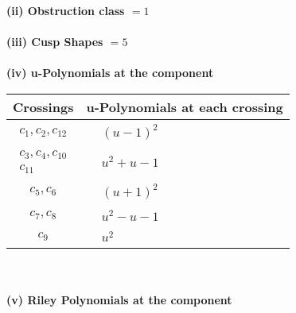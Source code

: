 \documentclass[1p]{elsarticle_modified}
\theoremstyle{definition}
\begin{document}
\flushleft \textbf{(ii) Obstruction class $= 1$}\\~\\
\flushleft \textbf{(iii) Cusp Shapes $= 5$}\\~\\
\newpage\renewcommand{\arraystretch}{1}
\flushleft \textbf{(iv) u-Polynomials at the component}\newline \\
\begin{tabular}{m{50pt}|m{274pt}}
Crossings & \hspace{64pt}u-Polynomials at each crossing \\
\hline $$\begin{aligned}c_{1},c_{2},c_{12}\end{aligned}$$&$\begin{aligned}
&(u-1)^2
\end{aligned}$\\
\hline $$\begin{aligned}c_{3},c_{4},c_{10}\\c_{11}\end{aligned}$$&$\begin{aligned}
&u^2+u-1
\end{aligned}$\\
\hline $$\begin{aligned}c_{5},c_{6}\end{aligned}$$&$\begin{aligned}
&(u+1)^2
\end{aligned}$\\
\hline $$\begin{aligned}c_{7},c_{8}\end{aligned}$$&$\begin{aligned}
&u^2- u-1
\end{aligned}$\\
\hline $$\begin{aligned}c_{9}\end{aligned}$$&$\begin{aligned}
&u^2
\end{aligned}$\\
\hline
\end{tabular}\\~\\
\newpage\renewcommand{\arraystretch}{1}
\flushleft \textbf{(v) Riley Polynomials at the component}\newline \\
\end{document}

